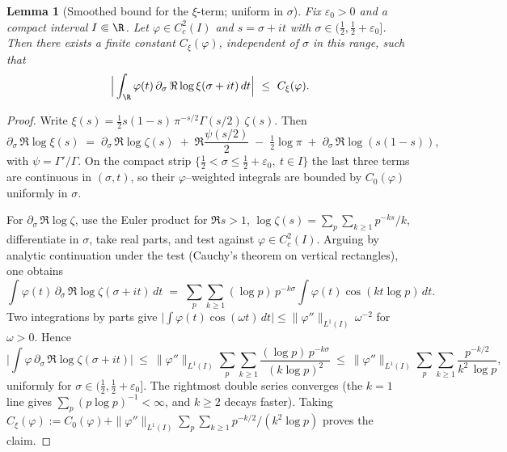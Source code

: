 \documentclass[11pt]{article}
\newtheorem{lemma}[theorem]{Lemma}
\theoremstyle{remark}
\begin{document}
\begin{lemma}[Smoothed bound for the $\xi$-term; uniform in $\sigma$]\label{lem:xi-smoothed}
Fix $\varepsilon_0>0$ and a compact interval $I\Subset\R$. Let $\varphi\in C_c^2(I)$ and $s=\sigma+it$ with $\sigma\in(\tfrac12,\tfrac12+\varepsilon_0]$. Then there exists a finite constant $C_\xi(\varphi)$, independent of $\sigma$ in this range, such that
\[
 \Big|\int_{\R}\varphi(t)\,\partial_\sigma\,\Re\log\xi(\sigma+it)\,dt\Big|\ \le\ C_\xi(\varphi).
\]
\end{lemma}
\begin{proof}
Write $\xi(s)=\tfrac12 s(1-s)\,\pi^{-s/2}\Gamma(s/2)\,\zeta(s)$. Then
\[
 \partial_\sigma\,\Re\log\xi(s)\;=\;\partial_\sigma\,\Re\log\zeta(s)\; +\; \Re\frac{\psi(s/2)}{2}\; -\; \tfrac12\log\pi\; +\; \partial_\sigma\,\Re\log(s(1-s)),
\]
with $\psi=\Gamma'/\Gamma$. On the compact strip $\{\tfrac12<\sigma\le\tfrac12+\varepsilon_0,\ t\in I\}$ the last three terms are continuous in $(\sigma,t)$, so their $\varphi$–weighted integrals are bounded by $C_0(\varphi)$ uniformly in $\sigma$.

For $\partial_\sigma\,\Re\log\zeta$, use the Euler product for $\Re s>1$,
\(\log\zeta(s)=\sum_{p}\sum_{k\ge1}p^{-ks}/k\),
differentiate in $\sigma$, take real parts, and test against $\varphi\in C_c^2(I)$. Arguing by analytic continuation under the test (Cauchy’s theorem on vertical rectangles), one obtains
\[
 \int \varphi(t)\,\partial_\sigma\,\Re\log\zeta(\sigma+it)\,dt\;=\;\sum_{p}\sum_{k\ge1} (\log p)\,p^{-k\sigma}\int \varphi(t)\cos(kt\log p)\,dt.
\]
Two integrations by parts give $\big|\int \varphi(t)\cos(\omega t)\,dt\big|\le \|\varphi''\|_{L^1(I)}\,\omega^{-2}$ for $\omega>0$. Hence
\[
 \Big|\int \varphi\,\partial_\sigma\,\Re\log\zeta(\sigma+it)\Big|\ \le\ \|\varphi''\|_{L^1(I)}\sum_{p}\sum_{k\ge1}\frac{(\log p)\,p^{-k\sigma}}{(k\log p)^2}\ \le\ \|\varphi''\|_{L^1(I)}\sum_{p}\sum_{k\ge1}\frac{p^{-k/2}}{k^2\,\log p},
\]
uniformly for $\sigma\in(\tfrac12,\tfrac12+\varepsilon_0]$. The rightmost double series converges (the $k\!=\!1$ line gives $\sum_{p}(p\log p)^{-1}<\infty$, and $k\ge2$ decays faster). Taking $C_\xi(\varphi):=C_0(\varphi)+\|\varphi''\|_{L^1(I)}\sum_{p}\sum_{k\ge1}p^{-k/2}/(k^2\log p)$ proves the claim.
\end{proof}
\end{document}

